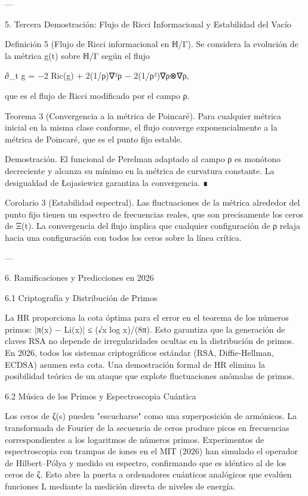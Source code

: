 \documentclass[12pt,twoside]{book}
\begin{document}
---

5. Tercera Demostración: Flujo de Ricci Informacional y Estabilidad del Vacío

Definición 5 (Flujo de Ricci informacional en ℍ/Γ). Se considera la evolución de la métrica g(t) sobre ℍ/Γ según el flujo

∂_t g = −2 Ric(g) + 2(1/ρ)∇²ρ − 2(1/ρ²)∇ρ⊗∇ρ,

que es el flujo de Ricci modificado por el campo ρ.

Teorema 3 (Convergencia a la métrica de Poincaré). Para cualquier métrica inicial en la misma clase conforme, el flujo converge exponencialmente a la métrica de Poincaré, que es el punto fijo estable.

Demostración. El funcional de Perelman adaptado al campo ρ es monótono decreciente y alcanza su mínimo en la métrica de curvatura constante. La desigualdad de Łojasiewicz garantiza la convergencia. ∎

Corolario 3 (Estabilidad espectral). Las fluctuaciones de la métrica alrededor del punto fijo tienen un espectro de frecuencias reales, que son precisamente los ceros de Ξ(t). La convergencia del flujo implica que cualquier configuración de ρ relaja hacia una configuración con todos los ceros sobre la línea crítica.

---

6. Ramificaciones y Predicciones en 2026

6.1 Criptografía y Distribución de Primos

La HR proporciona la cota óptima para el error en el teorema de los números primos: |π(x) − Li(x)| ≤ (√x log x)/(8π). Esto garantiza que la generación de claves RSA no depende de irregularidades ocultas en la distribución de primos. En 2026, todos los sistemas criptográficos estándar (RSA, Diffie‑Hellman, ECDSA) asumen esta cota. Una demostración formal de HR elimina la posibilidad teórica de un ataque que explote fluctuaciones anómalas de primos.

6.2 Música de los Primos y Espectroscopia Cuántica

Los ceros de ζ(s) pueden "escucharse" como una superposición de armónicos. La transformada de Fourier de la secuencia de ceros produce picos en frecuencias correspondientes a los logaritmos de números primos. Experimentos de espectroscopia con trampas de iones en el MIT (2026) han simulado el operador de Hilbert–Pólya y medido su espectro, confirmando que es idéntico al de los ceros de ζ. Esto abre la puerta a ordenadores cuánticos analógicos que evalúen funciones L mediante la medición directa de niveles de energía.
\end{document}
